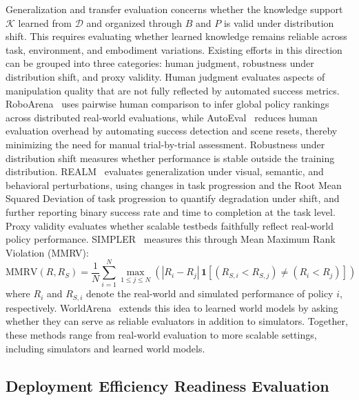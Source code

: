 \documentclass[acmsmall,screen,review]{acmart}
\begin{document}
Generalization and transfer evaluation concerns whether the knowledge support \(\mathcal{K}\) learned from \(\mathcal{D}\) and organized through \(B\) and \(P\) is valid under distribution shift. 
This requires evaluating whether learned knowledge remains reliable across task, environment, and embodiment variations.
Existing efforts in this direction can be grouped into three categories: human judgment, robustness under distribution shift, and proxy validity.
Human judgment evaluates aspects of manipulation quality that are not fully reflected by automated success metrics. 
RoboArena~\cite{atreya2025roboarena} uses pairwise human comparison to infer global policy rankings across distributed real-world evaluations, 
while AutoEval~\cite{zhou2025autoeval} reduces human evaluation overhead by automating success detection and scene resets, thereby minimizing the need for manual trial-by-trial assessment.
Robustness under distribution shift measures whether performance is stable outside the training distribution. 
REALM~\cite{sedlacek2025realm} evaluates generalization under visual, semantic, and behavioral perturbations, using changes in task progression and the Root Mean Squared Deviation of task progression to quantify degradation under shift, and further reporting binary success rate and time to completion at the task level.
Proxy validity evaluates whether scalable testbeds faithfully reflect real-world policy performance. SIMPLER~\cite{li2025simpler} measures this through Mean Maximum Rank Violation (MMRV):
\begin{equation}
\mathrm{MMRV}(R, R_S)
=
\frac{1}{N}
\sum_{i=1}^{N}
\max_{1 \le j \le N}
\left(
|R_i - R_j|\,
\mathbf{1}\!\left[(R_{S,i} < R_{S,j}) \ne (R_i < R_j)\right]
\right)
\end{equation}
where \(R_i\) and \(R_{S,i}\) denote the real-world and simulated performance of policy \(i\), respectively.
WorldArena~\cite{shang2026worldarena} extends this idea to learned world models by asking whether they can serve as reliable evaluators in addition to simulators. 
Together, these methods range from real-world evaluation to more scalable settings, including simulators and learned world models.

\subsection{Deployment Efficiency Readiness Evaluation}\label{sec:eval_energy}
\end{document}

